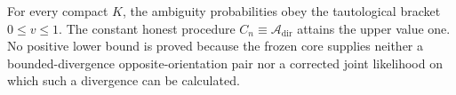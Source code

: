 For every compact \(K\), the ambiguity probabilities obey the tautological bracket \(0\leq v\leq1\).  The constant honest procedure \(C_n\equiv\mathcal A_{\mathrm{dir}}\) attains the upper value one.  No positive lower bound is proved because the frozen core supplies neither a bounded-divergence opposite-orientation pair nor a corrected joint likelihood on which such a divergence can be calculated.